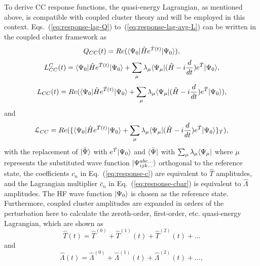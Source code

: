 To derive CC response functions, the quasi-energy Lagrangian, as mentioned above, is compatible with coupled cluster theory and will be employed in this context. Eqs.~(\ref{eq:response-lag-Q}) to~(\ref{eq:response-lag-avg-L}) can be written in the coupled cluster framework as
\begin{equation}
Q_{CC}(t) = Re(\langle\Psi_{0} |\hat{H}e^{\hat{T}(t)}| \Psi_{0} \rangle),
\end{equation}
\begin{equation}
L^{C}_{CC}(t) = \langle\Psi_{0} |\hat{H}e^{\hat{T}(t)}| \Psi_{0} \rangle + 
\sum_{\mu}\lambda_{\mu}\langle\Psi_{\mu} |(\hat{H}-i\frac{d}{dt})e^{\hat{T}}| \Psi_{0} \rangle,
\end{equation}
\begin{equation}
L_{CC}(t) = Re(\langle\Psi_{0} |\hat{H}e^{\hat{T}(t)}| \Psi_{0} \rangle + 
\sum_{\mu}\lambda_{\mu}\langle\Psi_{\mu} |(\hat{H}-i\frac{d}{dt})e^{\hat{T}}| \Psi_{0} \rangle),
\end{equation}
and
\begin{equation}
\mathcal{L}_{CC} = Re(\{ \langle\Psi_{0} |\hat{H}e^{\hat{T}(t)}| \Psi_{0} \rangle + 
\sum_{\mu}\lambda_{\mu}\langle\Psi_{\mu} |(\hat{H}-i\frac{d}{dt})e^{\hat{T}}| \Psi_{0} \rangle\}_{T}),
\end{equation}
with the replacement of $| \hat{\Psi} \rangle$ with $e^{\hat{T}}| \Psi_{0} \rangle$ and $\langle\bar{\Psi} |$ with $\sum_{\mu}\lambda_{\mu}\langle\Psi_{\mu} |$ where $\mu$ represents the substituted wave function $| \Psi_{ijk...}^{abc...} \rangle$ orthogonal to the reference state, the coefficients $c_{n}$ in Eq.~(\ref{eq:response-c}) are equivalent to $\hat{T}$ amplitudes, and the Lagrangian multiplier $\bar{c}_{n}$ in Eq.~(\ref{eq:response-cbar}) is equivalent to $\hat{\Lambda}$ amplitudes. The HF wave function $| \Psi_{0} \rangle$ is chosen as the reference state. Furthermore, coupled cluster amplitudes are expanded in orders of the perturbation here to calculate the zeroth-order, first-order, etc. quasi-energy Lagrangian, which are shown as 
\begin{equation}
\hat{T}(t) = \hat{T}^{(0)} + \hat{T}^{(1)}(t) + \hat{T}^{(2)}(t) + ...
\end{equation}
and
\begin{equation}
\hat{\Lambda}(t) = \hat{\Lambda}^{(0)} + \hat{\Lambda}^{(1)}(t) + \hat{\Lambda}^{(2)}(t) + ...,
\end{equation}
